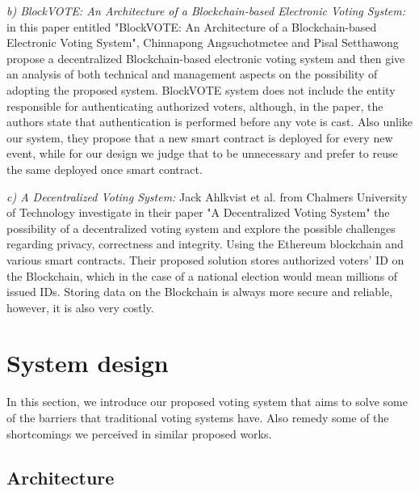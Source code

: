 \textit{b) BlockVOTE: An Architecture of a Blockchain-based Electronic Voting System:} in this paper entitled "BlockVOTE: An Architecture of a Blockchain-based Electronic Voting System"\cite{angsuchotmeteeBlockVOTEArchitectureBlockchainbased2019}, Chinnapong Angsuchotmetee and Pisal Setthawong propose a decentralized Blockchain-based electronic voting system and then give an analysis of both technical and management aspects on the possibility of adopting the proposed system. BlockVOTE system does not include the entity responsible for authenticating authorized voters, although, in the paper, the authors state that authentication is performed before any vote is cast. Also unlike our system, they propose that a new smart contract is deployed for every new event, while for our design we judge that to be unnecessary and prefer to reuse the same deployed once smart contract.
 
\textit{c) A Decentralized Voting System:} Jack Ahlkvist
et al. from Chalmers University of Technology investigate in their paper "A Decentralized Voting System"\cite{ahlkvistDecentralizedVotingSystem2019} the possibility of a decentralized voting system and explore the possible challenges regarding privacy, correctness and integrity. Using the Ethereum blockchain and various smart contracts. Their proposed solution stores authorized voters' ID on the Blockchain, which in the case of a national election would mean millions of issued IDs. Storing data on the Blockchain is always more secure and reliable, however, it is also very costly.

\section{System design}

In this section, we introduce our proposed voting system that aims to solve some of the barriers that traditional voting systems have. Also remedy some of the shortcomings we perceived in similar proposed works.

\subsection{Architecture}

